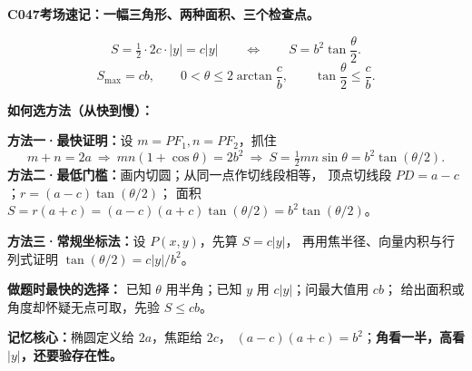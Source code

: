 \begin{summarybox}
\textbf{C047\quad 考场速记：一幅三角形、两种面积、三个检查点。}

\[
 \boxed{S=\tfrac12\cdot2c\cdot|y|=c|y|}
 \qquad\Longleftrightarrow\qquad
 \boxed{S=b^2\tan\frac\theta2}.
\]
\[
 \boxed{S_{\max}=cb},\qquad
 \boxed{0<\theta\le2\arctan\frac cb},\qquad
 \boxed{\tan\frac\theta2\le\frac cb}.
\]

\textbf{如何选方法（从快到慢）：}

\textbf{方法一·最快证明：}设 $m=PF_1,n=PF_2$，抓住
\[
 m+n=2a\ \Longrightarrow\ mn(1+\cos\theta)=2b^2
 \ \Longrightarrow\ S=\tfrac12mn\sin\theta=b^2\tan(\theta/2).
\]
\textbf{方法二·最低门槛：}画内切圆；从同一点作切线段相等，
顶点切线段 $PD=a-c$；$r=(a-c)\tan(\theta/2)$；
面积 $S=r(a+c)=(a-c)(a+c)\tan(\theta/2)=b^2\tan(\theta/2)$。

\textbf{方法三·常规坐标法：}设 $P(x,y)$，先算 $S=c|y|$，
再用焦半径、向量内积与行列式证明 $\tan(\theta/2)=c|y|/b^2$。

\medskip
\textbf{做题时最快的选择：}
已知 $\theta$ 用半角；已知 $y$ 用 $c|y|$；问最大值用 $cb$；
给出面积或角度却怀疑无点可取，先验 $S\le cb$。

\textbf{记忆核心：}椭圆定义给 $2a$，焦距给 $2c$，
$(a-c)(a+c)=b^2$；\textbf{角看一半，高看 $|y|$，还要验存在性。}
\end{summarybox}
